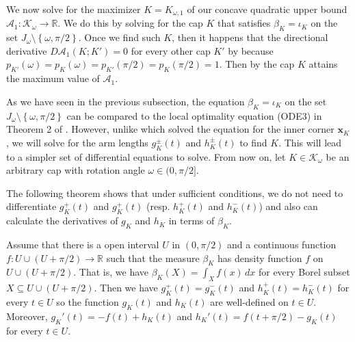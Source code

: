 We now solve for the maximizer \(K = K_{\omega, 1}\) of our concave quadratic upper bound \(\mathcal{A}_1 : \mathcal{K}_\omega \to \mathbb{R}\). We do this by solving for the cap \(K\) that satisfies \(\beta_{K} = \iota_{K}\) on the set \(J_\omega \setminus \left\{ \omega, \pi/2 \right\}\). Once we find such \(K\), then it happens that the directional derivative \(D\mathcal{A}_1(K; K') = 0\) for every other cap \(K'\) by  because \(p_{K'}(\omega) = p_K(\omega) = p_{K'}(\pi/2) = p_K(\pi/2) = 1\). Then by  the cap \(K\) attains the maximum value of \(\mathcal{A}_1\).

As we have seen in the previous subsection, the equation \(\beta_{K} = \iota_{K}\) on the set \(J_\omega \setminus \left\{ \omega, \pi/2 \right\}\) can be compared to the local optimality equation (ODE3) in Theorem 2 of \autocite{romikDifferentialEquationsExact2018}. However, unlike \autocite{romikDifferentialEquationsExact2018} which solved the equation for the inner corner \(\mathbf{x}_K\), we will solve for the arm lengths \(g_K^{\pm}(t)\) and \(h_K^{\pm}(t)\) to find \(K\). This will lead to a simpler set of differential equations to solve. From now on, let \(K \in \mathcal{K}_{\omega}\) be an arbitrary cap with rotation angle \(\omega \in (0, \pi/2]\).

The following theorem shows that under sufficient conditions, we do not need to differentiate \(g_K^+(t)\) and \(g_K^+(t)\) (resp. \(h_K^+(t)\) and \(h_K^-(t)\)) and also can calculate the derivatives of \(g_K\) and \(h_K\) in terms of \(\beta_K\).

\begin{theorem}

Assume that there is a open interval \(U\) in \((0, \pi/2)\) and a continuous function \(f : U \cup \left( U + \pi/2 \right) \to \mathbb{R}\) such that the measure \(\beta_K\) has density function \(f\) on \(U \cup (U + \pi/2)\). That is, we have \(\beta_K(X) = \int_X f(x)\,dx\) for every Borel subset \(X \subseteq U \cup (U + \pi/2)\). Then we have \(g_K^+(t) = g_K^-(t)\) and \(h_K^+(t) = h_K^-(t)\) for every \(t \in U\) so the function \(g_K(t)\) and \(h_K(t)\) are well-defined on \(t \in U\). Moreover, \(g_{K}'(t) = -f(t) + h_{K}(t)\) and \(h_K'(t) = f(t + \pi/2) - g_K(t)\) for every \(t \in U\).

\label{thm:arm-length-derivative}
\end{theorem}

